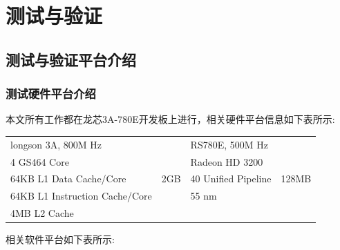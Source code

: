 
\chapter{测试与验证}

\section{测试与验证平台介绍}

\subsection{测试硬件平台介绍}
本文所有工作都在龙芯3A-780E开发板上进行，相关硬件平台信息如下表所示\cite{3A-780E}:

\begin{center}  
\tablelasttail{\bottomrule}

\begin{supertabular}{p{5.5cm}<{\centering}p{2.cm}<{\centering}p{5.5cm}<{\centering}p{2.cm}<{\centering}}
	longson 3A, 800M Hz& &  RS780E, 500M Hz& \\
	4 GS464 Core&  & Radeon HD 3200 & \\
	64KB L1 Data Cache/Core&  2GB&  40 Unified Pipeline& 128MB\\
	64KB L1 Instruction Cache/Core&  &  55 nm& \\
	4MB L2 Cache &  &  & \\
\end{supertabular}
\end{center}

相关软件平台如下表所示:

